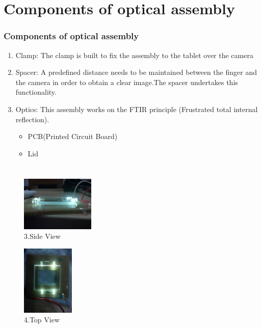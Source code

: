\documentclass[12pt]{beamer}
\begin{document}
\section{Components of optical assembly}
\begin{frame}[c]
\frametitle{Components of optical assembly}
\begin{enumerate}

\item \vskip-20pt Clamp: The clamp is built to fix the assembly to the tablet over the camera
\item Spacer:  A predefined distance needs to be maintained between the finger and the camera in order to obtain a clear image.The spacer undertakes this functionality. 
\item Optics: This assembly works on the FTIR principle (Frustrated total internal reflection). 
\begin{itemize}
\item PCB(Printed Circuit Board)
\item Lid
\end{itemize}
\end{enumerate}
\end{frame}




\section{}
\begin{frame}[c]
\frametitle{}
\begin{figure}
 \centering
 \includegraphics[width=3.5cm]{./sv.jpg}
 \caption{3.Side View}
\end{figure}
\begin{figure}
 \centering
 \vskip-20pt
 \includegraphics[width=2.5cm]{./tp.jpg}
 \caption{4.Top View}
\end{figure}
\end{frame}
\end{document}
